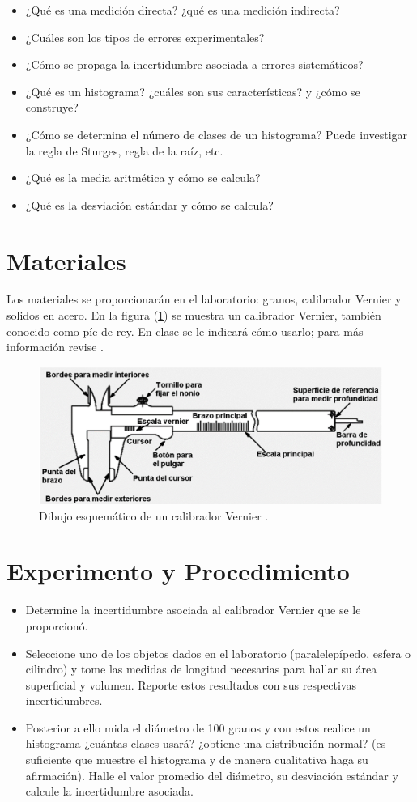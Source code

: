 \documentclass{replab}
\begin{document}
	\begin{itemize}
		\item ¿Qué es una medición directa? ¿qué es una medición indirecta?
		\item ¿Cuáles son los tipos de errores experimentales?
		\item ¿Cómo se propaga la incertidumbre asociada a errores sistemáticos?
		\item ¿Qué es un histograma? ¿cuáles son sus características? y ¿cómo se construye?
		\item ¿Cómo se determina el número de clases de un histograma? Puede investigar la regla de Sturges, regla de la raíz, etc.
		\item ¿Qué es la media aritmética y cómo se calcula?
		\item ¿Qué es la desviación estándar y cómo se calcula?
	\end{itemize}


	\section{Materiales} 

	Los materiales se proporcionarán en el laboratorio: granos, calibrador Vernier y solidos en acero. En la figura (\ref{fig:vernier}) se muestra un calibrador Vernier, también conocido como píe de rey. En clase se le indicará cómo usarlo; para más información revise \cite{cita}.

	\begin{figure}[htbp]
		\centering
		\includegraphics[width=.6\columnwidth]{imagenes/vernier1.png}
		\caption{Dibujo esquemático de un calibrador Vernier \cite{cita}.}
		\label{fig:vernier}
	\end{figure}

	\section{Experimento y Procedimiento}

	\begin{itemize}
		\item Determine la incertidumbre asociada al calibrador Vernier que se le proporcionó.
		\item Seleccione uno de los objetos dados en el laboratorio (paralelepípedo, esfera o cilindro) y tome las medidas de longitud necesarias para hallar su área superficial y volumen. Reporte estos resultados con sus respectivas incertidumbres.
		\item Posterior a ello mida el diámetro de 100 granos y con estos realice un histograma ¿cuántas clases usará? ¿obtiene una distribución normal? (es suficiente que muestre el histograma y de manera cualitativa haga su afirmación). Halle el valor promedio del diámetro, su desviación estándar y calcule la incertidumbre asociada.
	\end{itemize}
	
	\printbibliography[heading=bibintoc]
	
\end{document}
